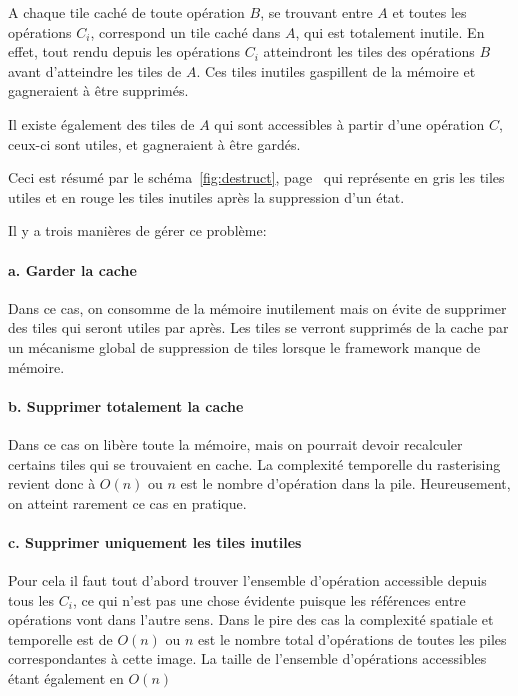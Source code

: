 			A chaque tile caché de toute opération $B$, se trouvant entre $A$ et toutes les opérations $C_i$, correspond un tile caché dans $A$,
			qui est totalement inutile. En effet, tout rendu depuis les opérations $C_i$ atteindront les tiles des opérations $B$ avant d'atteindre
			les tiles de $A$. Ces tiles inutiles gaspillent de la mémoire et gagneraient à être supprimés.

			Il existe également des tiles de $A$ qui sont accessibles à partir d'une opération $C$, ceux-ci sont utiles, et gagneraient à être
			gardés. 

			Ceci est résumé par le schéma~\ref{fig:destruct}, page~\pageref{fig:destruct} qui représente en gris les tiles utiles et
			en rouge les tiles inutiles après la suppression d'un état.

			Il y a trois manières de gérer ce problème:
			\paragraph{a. Garder la cache}
				Dans ce cas, on consomme de la mémoire inutilement mais on évite de supprimer des tiles qui seront utiles par après.
				Les tiles se verront supprimés de la cache par un mécanisme global de suppression de tiles lorsque le framework manque
				de mémoire.

			\paragraph{b. Supprimer totalement la cache}
				Dans ce cas on libère toute la mémoire, mais on pourrait devoir recalculer certains tiles qui se trouvaient en cache.
				La complexité temporelle du rasterising revient donc à $O(n)$ ou $n$ est le nombre d'opération dans la pile. Heureusement,
				on atteint rarement ce cas en pratique. 

			\paragraph{c. Supprimer uniquement les tiles inutiles}
				Pour cela il faut tout d'abord trouver l'ensemble d'opération accessible depuis tous les $C_i$, ce qui n'est pas une chose 
				évidente puisque les références entre opérations vont dans l'autre sens. Dans le pire des cas la complexité spatiale
				et temporelle est de $O(n)$ ou $n$ est le nombre total d'opérations de toutes les piles correspondantes à cette image.
				La taille de l'ensemble d'opérations accessibles étant également en $O(n)$
				
